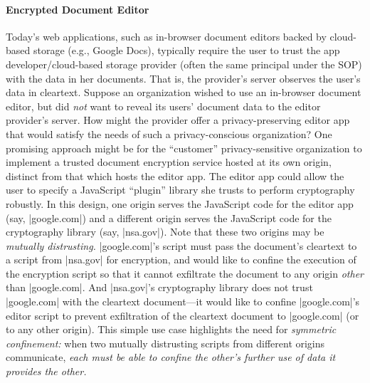 \paragraph{Encrypted Document Editor}
Today's web applications, such as in-browser document editors backed
by cloud-based storage (e.g., Google Docs), typically require the user
to trust the app developer/cloud-based storage provider (often the
same principal under the SOP) with the data in her documents. That is,
the provider's server observes the user's data in cleartext. Suppose
an organization wished to use an in-browser document editor, but did
{\em not} want to reveal its users' document data to the editor
provider's server. How might the provider offer a privacy-preserving
editor app that would satisfy the needs of such a privacy-conscious
organization?  One promising approach might be for the ``customer''
privacy-sensitive organization to implement a trusted document encryption
service hosted at its own origin, distinct from that which hosts the
editor app. The editor app could allow the user to specify a JavaScript
``plugin'' library she trusts to perform cryptography robustly. In this design,
one origin serves the JavaScript code for the editor app (say,
\js|google.com|) and a different origin serves the JavaScript code for
the cryptography library (say, \js|nsa.gov|). Note that these two
origins may be {\em mutually distrusting.}  \js|google.com|'s script
must pass the document's cleartext to a script from \js|nsa.gov| for
encryption, and would like to confine the execution of the encryption
script so that it cannot exfiltrate the document to any origin {\em
  other} than \js|google.com|. And \js|nsa.gov|'s cryptography library
does not trust \js|google.com| with the cleartext document---it would
like to confine \js|google.com|'s editor script to prevent
exfiltration of the cleartext document to \js|google.com| (or to any
other origin). This simple use case highlights the need for {\em
  symmetric confinement:} when two mutually distrusting scripts from
different origins communicate, {\em each must be able to confine the
  other's further use of data it provides the other.}

